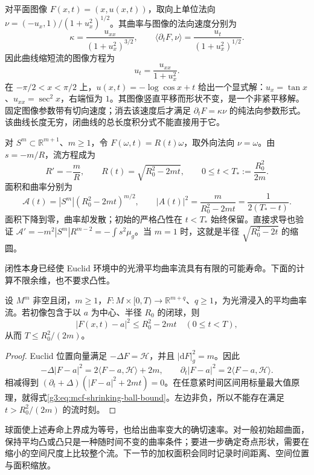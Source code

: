 \begin{example}\label{g3:exm:curve-shortening-graph-translator}
	对平面图像 \(F(x,t)=(x,u(x,t))\)，取向上单位法向
	\(\nu=(-u_x,1)/(1+u_x^2)^{1/2}\)。其曲率与图像的法向速度分别为
	\[
		\kappa=\frac{u_{xx}}{(1+u_x^2)^{3/2}},
		\qquad \langle\partial_tF,\nu\rangle=
		\frac{u_t}{(1+u_x^2)^{1/2}}.
	\]
	因此曲线缩短流的图像方程为
	\[
		u_t=\frac{u_{xx}}{1+u_x^2}.
	\]
	在 \(-\pi/2<x<\pi/2\) 上，\(u(x,t)=-\log\cos x+t\) 给出一个显式解：\(u_x=\tan x\)、\(u_{xx}=\sec^2x\)，右端恒为 \(1\)。其图像竖直平移而形状不变，是一个非紧平移解。固定图像参数带有切向速度；消去该速度后才满足 \(\partial_tF=\kappa\nu\) 的纯法向参数形式。该曲线长度无穷，闭曲线的总长度积分式不能直接用于它。
\end{example}

\begin{example}\label{g3:exm:mcf-shrinking-sphere}
	对 \(S^m\subset\mathbb R^{m+1}\)、\(m\ge1\)，令 \(F(\omega,t)=R(t)\omega\)，取外向法向 \(\nu=\omega\)。由 \(s=-m/R\)，流方程成为
	\[
		R'=-\frac mR,
		\qquad R(t)=\sqrt{R_0^2-2mt},
		\qquad 0\le t<T_*:=\frac{R_0^2}{2m}.
	\]
	面积和曲率分别为
	\[
		\mathcal A(t)=|S^m|(R_0^2-2mt)^{m/2},
		\qquad |A(t)|^2=\frac m{R_0^2-2mt}
		=\frac1{2(T_*-t)}.
	\]
	面积下降到零，曲率却发散；初始的严格凸性在 \(t<T_*\) 始终保留。直接求导也验证
	\(\mathcal A'=-m^2|S^m|R^{m-2}=-\int s^2\mu_g\)。当 \(m=1\) 时，这就是半径 \(\sqrt{R_0^2-2t}\) 的缩圆。
\end{example}

闭性本身已经使 Euclid 环境中的光滑平均曲率流具有有限的可能寿命。下面的计算不限余维，也不要求凸性。

\begin{proposition}\label{g3:prop:mcf-finite-lifetime}
	设 \(M^m\) 非空且闭，\(m\ge1\)，\(F:M\times[0,T)\to\mathbb R^{m+q}\)、\(q\ge1\)，为光滑浸入的平均曲率流。若初像包含于以 \(a\) 为中心、半径 \(R_0\) 的闭球，则
	\begin{equation}\label{g3:eq:mcf-shrinking-ball-bound}
		|F(x,t)-a|^2\le R_0^2-2mt
		\quad(0\le t<T),
	\end{equation}
	从而 \(T\le R_0^2/(2m)\)。
\end{proposition}
\begin{proof}
	Euclid 位置向量满足 \(-\Delta F=\mathcal H\)，并且 \(|\mathrm dF|_g^2=m\)。因此
	\[
		-\Delta|F-a|^2=2\langle F-a,\mathcal H\rangle+2m,
		\qquad \partial_t|F-a|^2=2\langle F-a,\mathcal H\rangle.
	\]
	相减得到 \((\partial_t+\Delta)(|F-a|^2+2mt)=0\)。在任意紧时间区间用标量最大值原理，就得式\eqref{g3:eq:mcf-shrinking-ball-bound}。左边非负，所以不能存在满足 \(t>R_0^2/(2m)\) 的流时刻。
\end{proof}

球面使上述寿命上界成为等号，也给出曲率变大的确切速率。对一般初始超曲面，保持平均凸或凸只是一种随时间不变的曲率条件；要进一步确定奇点形状，需要在缩小的空间尺度上比较整个流。下一节的加权面积会同时记录时间距离、空间位置与面积缩放。
